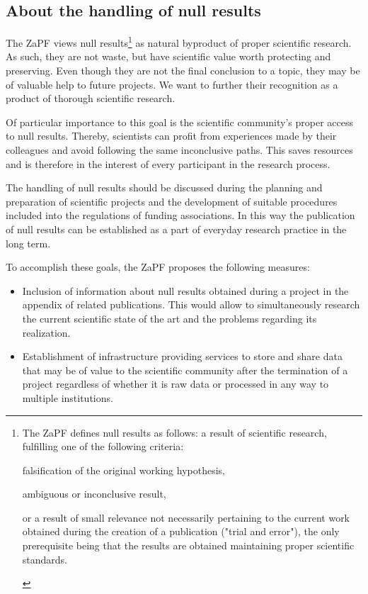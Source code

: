 \newpage
\subsection{About the handling of null results}
The ZaPF views null results\footnote{The ZaPF defines null results as follows: a result of scientific research, fulfilling one of the following criteria:
\begin{compactitem}
  \item falsification of the original working hypothesis,
  \item ambiguous or inconclusive result,
  \item or a result of small relevance not necessarily pertaining to the current work obtained during the creation of a publication ("trial and error"),
    the only prerequisite being that the results are obtained maintaining proper scientific standards.
\end{compactitem}
} as natural byproduct of proper scientific research. As such, they are not waste, but have scientific value worth protecting and preserving. Even though they are not the final conclusion to a topic, they may be of valuable help to future projects. We want to further their recognition as a product of thorough scientific research.

Of particular importance to this goal is the scientific community's proper access to null results. Thereby, scientists can profit from experiences made by their colleagues and avoid following the same inconclusive paths. This saves resources and is therefore in the interest of every participant in the research process.

The handling of null results should be discussed during the planning and preparation of scientific projects and the development of suitable procedures included into the regulations of funding associations. In this way the publication of null results can be established as a part of everyday research practice in the long term.

To accomplish these goals, the ZaPF proposes the following measures:
\begin{itemize}
  \item Inclusion of information about null results obtained during a project in the appendix of related publications. This would allow to simultaneously research the current scientific state of the art and the problems regarding its realization.
  \item Establishment of infrastructure providing services to store and share data that may be of value to the scientific community after the termination of a project regardless of whether it is raw data or processed in any way to multiple institutions.
\end{itemize}